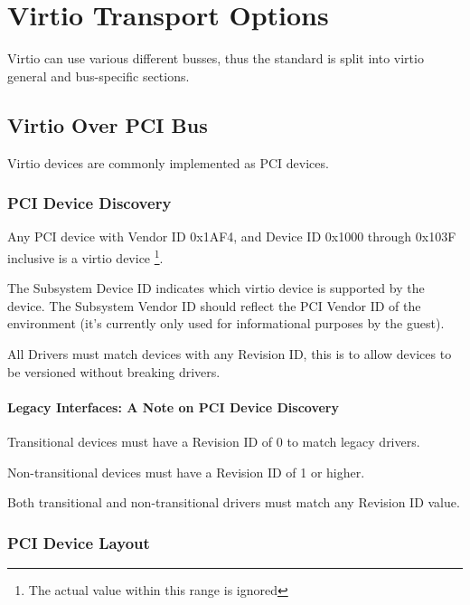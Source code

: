 \chapter{Virtio Transport Options}\label{sec:Virtio Transport Options}

Virtio can use various different busses, thus the standard is split
into virtio general and bus-specific sections.

\section{Virtio Over PCI Bus}\label{sec:Virtio Transport Options / Virtio Over PCI Bus}

Virtio devices are commonly implemented as PCI devices.

\subsection{PCI Device Discovery}\label{sec:Virtio Transport Options / Virtio Over PCI Bus / PCI Device Discovery}

Any PCI device with Vendor ID 0x1AF4, and Device ID 0x1000 through
0x103F inclusive is a virtio device
\footnote{The actual value within this range is ignored
}.

The Subsystem Device ID indicates which virtio device is
supported by the device. The Subsystem Vendor ID should reflect
the PCI Vendor ID of the environment (it's currently only used
for informational purposes by the guest).

All Drivers must match devices with any Revision ID, this
is to allow devices to be versioned without breaking drivers.

\subsubsection{Legacy Interfaces: A Note on PCI Device Discovery}\label{sec:Virtio Transport Options / Virtio Over PCI Bus / PCI Device Discovery / Legacy Interfaces: A Note on PCI Device Discovery}
Transitional devices must have a Revision ID of 0 to match
legacy drivers.

Non-transitional devices must have a Revision ID of 1 or higher.

Both transitional and non-transitional drivers must match
any Revision ID value.

\subsection{PCI Device Layout}\label{sec:Virtio Transport Options / Virtio Over PCI Bus / PCI Device Layout}


